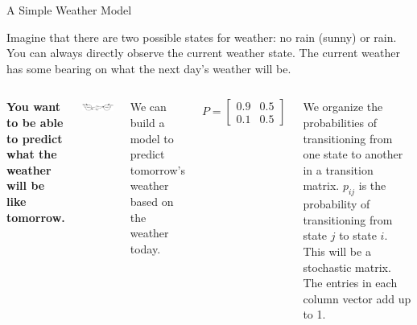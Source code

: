 \documentclass[xcolor=dvipsnames,aspectratio=169,t]{beamer}
\begin{document}
\begin{frame}{A Simple Weather Model}
  \smallskip
  
  \bi
  \ii Imagine that there are two possible states for weather: no rain (sunny) or rain.
  \ii You can always directly observe the current weather state.
  \ii The current weather has some bearing on what the next day’s weather will be.
  \ei
  \medskip

  \begin{columns}[T]

  \column{0.475\tw}

  \textbf{You want to be able to predict what the weather will be like tomorrow.}
  \pause

  \begin{center}
  \includegraphics[width=0.9\tw]{images/fig-weather.png}
  \end{center}

  We can build a model to predict tomorrow's weather based on the weather \alert{today}.

  \column{0.5\tw}

  \[ P = \begin{bmatrix} 0.9 & 0.5 \\ 0.1 & 0.5 \end{bmatrix} \]

  \bi
  \ii We organize the probabilities of transitioning from one state to another in a \alert{transition matrix}.
  \ii $p_{ij}$ is the probability of transitioning from \alert{state $j$} to \alert{state $i$}.
  \ii This will be a \alert{stochastic matrix}. The entries in each column vector add up to 1.
  \ei

  \end{columns}
\end{frame}
\end{document}
